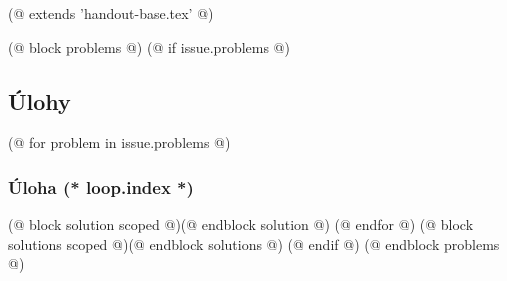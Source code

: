 (@ extends 'handout-base.tex' @)

(@ block problems @)
    (@ if issue.problems @)
        \subsection{Úlohy}
        (@ for problem in issue.problems @)
            \subsubsection{Úloha (* loop.index *)}
            (@ block solution scoped @)(@ endblock solution @)
        (@ endfor @)
        (@ block solutions scoped @)(@ endblock solutions @)
    (@ endif @)
(@ endblock problems @)
